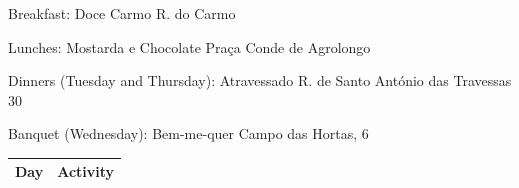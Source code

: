 \documentclass[11pt]{article}
\begin{document}
Breakfast:
Doce Carmo
R. do Carmo

Lunches:
Mostarda e Chocolate
Praça Conde de Agrolongo

Dinners (Tuesday and Thursday):
Atravessado
R. de Santo António das Travessas 30

Banquet (Wednesday):
Bem-me-quer
Campo das Hortas, 6

\begin{table}
    \renewcommand{\arraystretch}{1.4}
     \begin{center}
      \begin{tabular}{m{6cm} m{8cm}} %
        \hline
        \rowcolor{gray!35}\centering\arraybackslash\textbf{Day} & \centering\arraybackslash\textbf{Activity} \\
        \hline%
        

\end{tabular}
\end{center}
\end{table}
\end{document}
